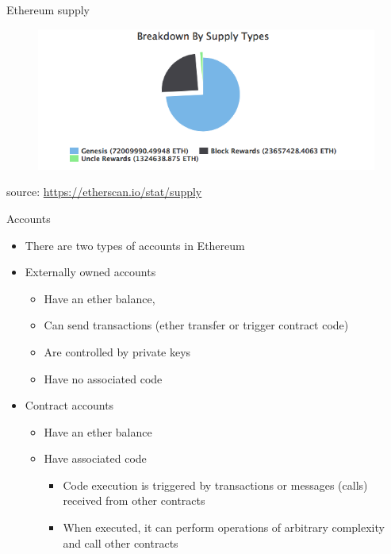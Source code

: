 \documentclass[11pt]{beamer}
\begin{document}

\begin{frame}{Ethereum supply}
	\begin{figure}[]
		\centering
		\includegraphics  [scale=0.5]{Images/eth-breakdown}
	\end{figure}
	\begin{scriptsize}
		source: \href{https://etherscan.io/stat/supply}{https://etherscan.io/stat/supply}
	\end{scriptsize}
\end{frame}


\begin{frame}{Accounts}
	\begin{itemize}
		\item There are two types of accounts in Ethereum
		\item Externally owned accounts
		\begin{small}
			\begin{itemize}
				\item Have an ether balance,
				\item Can send transactions (ether transfer or trigger contract code)
				\item Are controlled by private keys
				\item Have no associated code
			\end{itemize}
		\end{small}
		\item Contract accounts
		\begin{small}
			\begin{itemize}
				\item Have an ether balance
				\item Have associated code
				\begin{itemize}
					\item Code execution is triggered by transactions or messages (calls) received from other contracts
					\item When executed, it can perform operations of arbitrary complexity and call other contracts
				\end{itemize}
			\end{itemize}
		\end{small}
	\end{itemize}
\end{frame}
\end{document}
